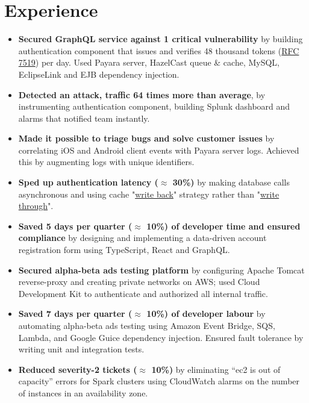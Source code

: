 \section{Experience}
\begin{itemize}[leftmargin=*]
    \item {
        \textbf{Secured GraphQL service against 1 critical vulnerability} by building authentication component that issues and verifies 48 thousand tokens (\href{https://datatracker.ietf.org/doc/html/rfc7519}{RFC 7519}) per day. Used Payara server, HazelCast queue \& cache, MySQL, EclipseLink and EJB dependency injection.
    }
    \item {
        \textbf{Detected an attack, traffic 64 times more than average}, by instrumenting authentication component, building Splunk dashboard and alarms that notified team instantly.
    }
    \item {
        \textbf{Made it possible to triage bugs and solve customer issues} by correlating iOS and Android client events with Payara server logs. Achieved this by augmenting logs with unique identifiers.
    }
    \item {
        \textbf{Sped up authentication latency ($\approx$ 30\%)} by making database calls asynchronous and using cache "\href{https://en.wikipedia.org/wiki/Cache_(computing)#Writing_policies}{write back}" strategy rather than "\href{https://en.wikipedia.org/wiki/Cache_(computing)#Writing_policies}{write through}".
    }
    \item {
        \textbf{Saved 5 days per quarter ($\approx$ 10\%) of developer time and ensured compliance} by designing and implementing a data-driven account registration form using TypeScript, React and GraphQL.
    }
\end{itemize}

\begin{itemize}[leftmargin=*]
    \item {
        \textbf{Secured alpha-beta ads testing platform} by configuring Apache Tomcat reverse-proxy and creating private networks on AWS; used Cloud Development Kit to authenticate and authorized all internal traffic.
    }
    \item {
        \textbf{Saved 7 days per quarter ($\approx$ 10\%) of developer labour} by automating alpha-beta ads testing using Amazon Event Bridge, SQS, Lambda, and Google Guice dependency injection. Ensured fault tolerance by writing unit and integration tests.
    }
    \item {
        \textbf{Reduced severity-2 tickets ($\approx$ 10\%)} by eliminating “ec2 is out of capacity” errors for Spark clusters using CloudWatch alarms on the number of instances in an availability zone.
    }
\end{itemize}

